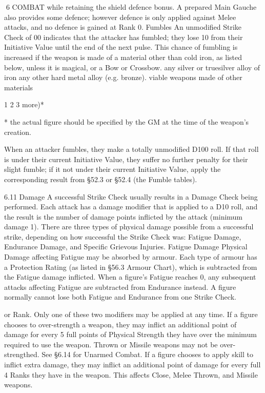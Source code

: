 \documentclass[a4paper]{article}
\begin{document}
\begin{multicols}{3}
6 COMBAT
while retaining the shield defence bonus. A prepared Main Gauche also provides some defence;
however defence is only applied against Melee
attacks, and no defence is gained at Rank 0.
Fumbles
An unmodified Strike Check of 00 indicates that
the attacker has fumbled; they lose 10 from their
Initiative Value until the end of the next pulse. This
chance of fumbling is increased if the weapon is
made of a material other than cold iron, as listed
below, unless it is magical, or a Bow or Crossbow.
any silver or truesilver alloy of
iron
any other hard metal alloy (e.g.
bronze).
viable weapons made of other
materials

1%
2%
3%
more)*

* the actual figure should be specified by the GM at the
time of the weapon’s creation.

When an attacker fumbles, they make a totally
unmodified D100 roll. If that roll is under their
current Initiative Value, they suffer no further
penalty for their slight fumble; if it not under their
current Initiative Value, apply the corresponding
result from §52.3 or §52.4 (the Fumble tables).

6.11 Damage
A successful Strike Check usually results in a
Damage Check being performed. Each attack has a
damage modifier that is applied to a D10 roll, and
the result is the number of damage points inflicted
by the attack (minimum damage 1). There are three
types of physical damage possible from a successful strike, depending on how successful the Strike
Check was: Fatigue Damage, Endurance Damage,
and Specific Grievous Injuries.
Fatigue Damage
Physical Damage affecting Fatigue may be absorbed by armour. Each type of armour has a Protection Rating (as listed in §56.3 Armour Chart),
which is subtracted from the Fatigue damage inflicted. When a figure’s Fatigue reaches 0, any
subsequent attacks affecting Fatigue are subtracted
from Endurance instead. A figure normally cannot
lose both Fatigue and Endurance from one Strike
Check.

or Rank. Only one of these two modifiers may be
applied at any time.
If a figure chooses to over-strength a weapon, they
may inflict an additional point of damage for every
5 full points of Physical Strength they have over
the minimum required to use the weapon. Thrown
or Missile weapons may not be over-strengthed.
See §6.14 for Unarmed Combat.
If a figure chooses to apply skill to inflict extra
damage, they may inflict an additional point of
damage for every full 4
Ranks they have in the weapon. This affects Close,
Melee Thrown, and Missile weapons.


\end{multicols}
\end{document}
